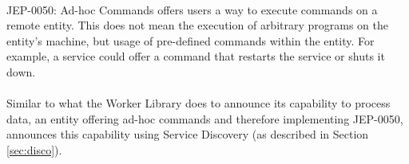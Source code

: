 \paragraph{}
JEP-0050: Ad-hoc Commands offers users a way to execute commands on a remote entity. This does not mean the execution of arbitrary programs on the entity's machine, but usage of pre-defined commands within the entity. For example, a service could offer a command that restarts the service or shuts it down.

\paragraph{}
Similar to what the Worker Library does to announce its capability to process data, an entity offering ad-hoc commands and therefore implementing JEP-0050, announces this capability using Service Discovery (as described in Section \ref{sec:disco}).